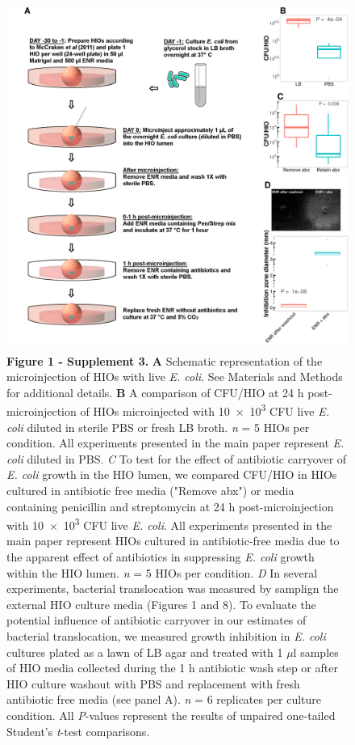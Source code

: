 \documentclass[9pt,lineo]{elife}
\date{\today}
\title{}
\begin{document}
\begin{figure}
\begin{fullwidth}
\centering\includegraphics[width=0.85\linewidth]{./figures/figure1/sfigure1-3_multipanel.pdf}
\caption*{\textbf{Figure 1 - Supplement 3. } \textbf{A} Schematic representation of the microinjection of HIOs with live \textit{E. coli}. See Materials and Methods for additional details. \textbf{B} A comparison of CFU/HIO at 24 h post-microinjection of HIOs microinjected with \num{10e3} CFU live \textit{E. coli} diluted in sterile PBS or fresh LB broth. \textit{n} = 5 HIOs per condition. All experiments presented in the main paper represent \textit{E. coli} diluted in PBS. \textit{C} To test for the effect of antibiotic carryover of \textit{E. coli} growth in the HIO lumen, we compared CFU/HIO in HIOs cultured in antibiotic free media ("Remove abx") or media containing penicillin and streptomycin at 24 h post-microinjection with \num{10e3} CFU live \textit{E. coli}. All experiments presented in the main paper represent HIOs cultured in antibiotic-free media due to the apparent effect of antibiotics in suppressing \textit{E. coli} growth within the HIO lumen. \textit{n} = 5 HIOs per condition. \textit{D} In several experiments, bacterial translocation was measured by samplign the external HIO culture media (Figures 1 and 8). To evaluate the potential influence of antibiotic carryover in our estimates of bacterial translocation, we measured growth inhibition in \textit{E. coli} cultures plated as a lawn of LB agar and treated with 1 $\mu$l samples of HIO media collected during the 1 h antibiotic wash step or after HIO culture washout with PBS and replacement with fresh antibiotic free media (see panel A). \textit{n} = 6 replicates per culture condition. All \textit{P}-values represent the results of unpaired one-tailed Student's \textit{t}-test comparisons.}
\label{fig:fullwidth}
\end{fullwidth}
\end{figure}
\end{document}
